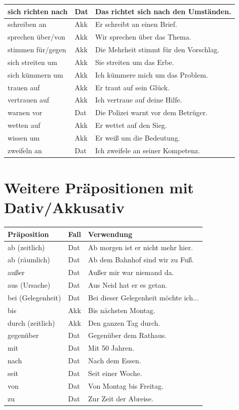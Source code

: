\begin{center}
\begin{tabular}{|l|l|l|}
sich richten nach & Dat & Das richtet sich nach den Umständen. \\ \hline
schreiben an & Akk & Er schreibt an einen Brief. \\ \hline
sprechen über/von & Akk & Wir sprechen über das Thema. \\ \hline
stimmen für/gegen & Akk & Die Mehrheit stimmt für den Vorschlag. \\ \hline
sich streiten um & Akk & Sie streiten um das Erbe. \\ \hline
sich kümmern um & Akk & Ich kümmere mich um das Problem. \\ \hline
trauen auf & Akk & Er traut auf sein Glück. \\ \hline
vertrauen auf & Akk & Ich vertraue auf deine Hilfe. \\ \hline
warnen vor & Dat & Die Polizei warnt vor dem Betrüger. \\ \hline
wetten auf & Akk & Er wettet auf den Sieg. \\ \hline
wissen um & Akk & Er weiß um die Bedeutung. \\ \hline
zweifeln an & Dat & Ich zweifele an seiner Kompetenz. \\ \hline
\end{tabular}
\end{center}

\section{Weitere Präpositionen mit Dativ/Akkusativ}
\label{sec:C2WeiterePraep}

\bigskip
\begin{center}
\begin{tabular}{|l|l|p{6cm}|}
\hline
Präposition & Fall & Verwendung \\ \hline
ab (zeitlich) & Dat & Ab morgen ist er nicht mehr hier. \\ \hline
ab (räumlich) & Dat & Ab dem Bahnhof sind wir zu Fuß. \\ \hline
außer & Dat & Außer mir war niemand da. \\ \hline
aus (Ursache) & Dat & Aus Neid hat er es getan. \\ \hline
bei (Gelegenheit) & Dat & Bei dieser Gelegenheit möchte ich... \\ \hline
bis & Akk & Bis nächsten Montag. \\ \hline
durch (zeitlich) & Akk & Den ganzen Tag durch. \\ \hline
gegenüber & Dat & Gegenüber dem Rathaus. \\ \hline
mit & Dat & Mit 50 Jahren. \\ \hline
nach & Dat & Nach dem Essen. \\ \hline
seit & Dat & Seit einer Woche. \\ \hline
von & Dat & Von Montag bis Freitag. \\ \hline
zu & Dat & Zur Zeit der Abreise. \\ \hline
\end{tabular}
\end{center}

